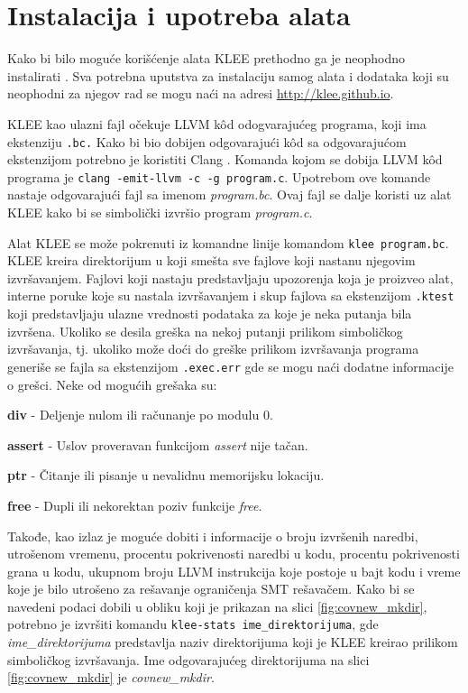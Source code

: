 \documentclass[12pt,oneside]{memoir}
\begin{document}
\section{Instalacija i upotreba alata} \label{instalacija}

Kako bi bilo moguće korišćenje alata KLEE prethodno ga je neophodno instalirati . Sva potrebna uputstva za instalaciju samog alata i dodataka koji su neophodni za njegov rad se mogu naći na adresi \url{http://klee.github.io}.

KLEE kao ulazni fajl očekuje LLVM \cite{llvm} k\^od odogvarajućeg programa, koji ima ekstenziju \texttt{.bc.} Kako bi bio dobijen odgovarajući k\^od sa odgovarajućom ekstenzijom potrebno je koristiti Clang \cite{clang}. Komanda kojom se dobija LLVM k\^od programa je \texttt{clang -emit-llvm -c -g program.c}. Upotrebom ove komande nastaje odgovarajući fajl sa imenom \textit{program.bc}. Ovaj fajl se dalje koristi uz alat KLEE kako bi se simbolički izvršio program \textit{program.c}.

Alat KLEE se može pokrenuti iz komandne linije komandom \texttt{klee program.bc}. KLEE kreira direktorijum u koji smešta sve fajlove koji nastanu njegovim izvršavanjem. Fajlovi koji nastaju predstavljaju upozorenja koja je proizveo alat, interne poruke koje su nastala izvršavanjem i skup fajlova sa ekstenzijom \texttt{.ktest} koji predstavljaju ulazne vrednosti podataka za koje je neka putanja bila izvršena. Ukoliko se desila greška na nekoj putanji prilikom simboličkog izvršavanja, tj. ukoliko može doći do greške prilikom izvršavanja programa generiše se fajla sa ekstenzijom \texttt{.exec.err} gde se mogu naći dodatne informacije o grešci. Neke od mogućih grešaka su:

\begin{description}
    \item \textbf{div} - Deljenje nulom ili računanje po modulu 0.
    
    \item \textbf{assert} - Uslov proveravan funkcijom \textit{assert} nije tačan.
    
    \item \textbf{ptr} - Čitanje ili pisanje u nevalidnu memorijsku lokaciju.
    
    \item \textbf{free} - Dupli ili nekorektan poziv funkcije \textit{free}.
\end{description}

Takođe, kao izlaz je moguće dobiti i informacije o broju izvršenih naredbi, utrošenom vremenu, procentu pokrivenosti naredbi u kodu, procentu pokrivenosti grana u kodu, ukupnom broju LLVM instrukcija koje postoje u bajt kodu i vreme koje je bilo utrošeno za rešavanje ograničenja SMT rešavačem. Kako bi se navedeni podaci dobili u obliku koji je prikazan na slici \ref{fig:covnew_mkdir}, potrebno je izvršiti komandu \texttt{klee-stats ime\_direktorijuma}, gde \textit{ime\_direktorijuma} predstavlja naziv direktorijuma koji je KLEE kreirao prilikom simboličkog izvršavanja. Ime odgovarajućeg direktorijuma na slici \ref{fig:covnew_mkdir} je \textit{covnew\_mkdir}.
\end{document}
